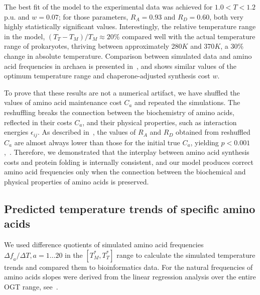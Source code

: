 \documentclass[10pt,letterpaper]{article}
\begin{document}
The best fit of the model to the experimental data was achieved for $1.0<T<1.2$ p.u. and $w=0.07$; for those parameters, $R_A=0.93$ and $R_D=0.60$, both very highly statistically significant values. Interestingly, the relative temperature range in the model, $(T_T-T_M)/T_M\approx 20\%$ compared well with the actual temperature range of prokaryotes, thriving between approximately 280$K$ and 370$K$, a 30\% change in absolute temperature. Comparison between simulated data and amino acid frequencies in archaea is presented in~, and shows similar values of the optimum temperature range and chaperone-adjusted synthesis cost $w$.

To prove that these results are not a numerical artifact, we have shuffled the values of amino acid maintenance cost $C_a$ and repeated the simulations. The reshuffling breaks the connection between the biochemistry of amino acids, reflected in their costs $C_a$, and their physical properties, such as interaction energies $\epsilon_{ij}$. As described in~, the values of $R_A$ and $R_D$ obtained from reshuffled $C_a$ are almost always lower than those for the initial true $C_a$, yielding $p<0.001$,~. Therefore, we demonstrated that the interplay between amino acid synthesis costs and protein folding is internally consistent, and our model produces correct amino acid frequencies only when the connection between the biochemical and physical properties of amino acids is preserved.

 
\subsection*{Predicted temperature trends of specific amino acids}
    
We used difference quotients of simulated amino acid frequencies $\Delta\mathit{f}_{a}/\Delta T, a=1\dots20$ in the $[T^*_M,T^*_T]$ range to calculate the simulated temperature trends and compared them to bioinformatics data. For the natural frequencies of amino acids slopes were derived from the linear regression analysis over the entire OGT range, see~.
\end{document}
